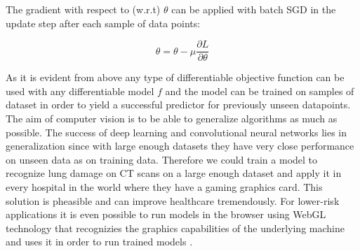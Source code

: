 \documentclass[a4paper,12pt]{article}
\begin{document}
\vspace{4mm}

\par The gradient with respect to (w.r.t) $\theta$ can be applied with batch SGD in the update step after each sample of data points:

\vspace{4mm}

\begin{equation}
    \theta = \theta - \mu \frac{\partial L}{\partial \theta}
\end{equation}

\vspace{4mm}

\par As it is evident from above any type of differentiable objective function can be used with any differentiable model $f$ and the model can be trained on samples of dataset in order to yield a successful predictor for previously unseen datapoints. The aim of computer vision is to be able to generalize algorithms as much as possible. The success of deep learning and convolutional neural networks lies in generalization since with large enough datasets they have very close performance on unseen data as on training data. Therefore we could train a model to recognize lung damage on CT scans on a large enough dataset and apply it in every hospital in the world where they have a gaming graphics card. This solution is pheasible and can improve healthcare tremendously. For lower-risk applications it is even possible to run models in the browser using WebGL technology that recognizies the graphics capabilities of the underlying machine and uses it in order to run trained models \cite{cohen2019chester}.

\newpage



\end{document}
